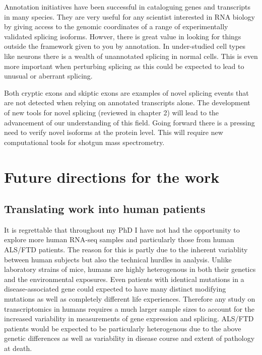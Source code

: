 Annotation initiatives have been successful in cataloguing genes and transcripts in many species.
They are very useful for any scientist interested in RNA biology by giving access to the genomic coordinates of a range of experimentally validated splicing isoforms.
Howver, there is great value in looking for things outside the framework given to you by annotation.
In under-studied cell types like neurons there is a wealth of unannotated splicing in normal cells.
This is even more important when perturbing splicing as this could be expected to lead to unusual or aberrant splicing.

Both cryptic exons and skiptic exons are examples of novel splicing events that are not detected when relying on annotated transcripts alone.
The development of new tools for novel splicing (reviewed in chapter 2) will lead to the advancement of our understanding of this field.
Going forward there is a pressing need to verify novel isoforms at the protein level. 
This will require new computational tools for shotgun mass spectrometry.

	
\section{Future directions for the work}

\subsection{Translating work into human patients}

It is regrettable that throughout my PhD I have not had the opportunity to explore more human RNA-seq samples and particularly those from human ALS/FTD patients.
The reason for this is partly due to the inherent variablity between human subjects but also the technical hurdles in analysis.
Unlike laboratory strains of mice, humans are highly heterogenous in both their genetics and the environmental exposures.
Even patients with identical mutations in a disease-associated gene could  expected to have many distinct modifying mutations as well as completely different life experiences.
Therefore any study on transcriptomics in humans requires a much larger sample sizes to account for the increased variability in measurements of gene expression and splicing.
ALS/FTD patients would be expected to be particularly heterogenous due to the above genetic differences as well as variability in disease course and extent of pathology at death.


